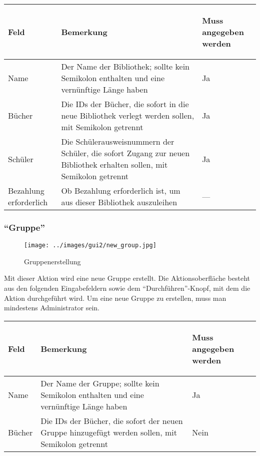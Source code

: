 \begin{tabular}{|p{}|p{}|p{}|}\hline
\begin{center}Feld\end{center} & \begin{center}Bemerkung\end{center} & \begin{center}Muss angegeben werden\end{center}\\
\hline
Name & Der Name der Bibliothek; sollte kein Semikolon enthalten und eine vernünftige Länge haben & Ja\\
\hline
Bücher & Die IDs der Bücher, die sofort in die neue Bibliothek verlegt werden sollen, mit Semikolon getrennt & Ja\\
\hline
Schüler & Die Schülerausweisnummern der Schüler, die sofort Zugang zur neuen Bibliothek erhalten sollen, mit Semikolon getrennt & Ja\\
\hline
Bezahlung erforderlich & Ob Bezahlung erforderlich ist, um aus dieser Bibliothek auszuleihen &  ---\\
\hline
\end{tabular}


\subsubsection{``Gruppe''}
\label{subsubsec:detail:new:group}
\begin{figure}\texttt{[image: ../images/gui2/new\_group.jpg]}\caption{Gruppenerstellung}\label{fig:new_group}\end{figure}

Mit dieser Aktion wird eine neue Gruppe erstellt. Die Aktionsoberfläche besteht aus den folgenden Eingabefeldern sowie dem ``Durchführen''-Knopf, mit dem die Aktion durchgeführt wird.
Um eine neue Gruppe zu erstellen, muss man mindestens Administrator sein.

\begin{tabular}{|p{}|p{}|p{}|}\hline
\begin{center}Feld\end{center} & \begin{center}Bemerkung\end{center} & \begin{center}Muss angegeben werden\end{center}\\
\hline
Name & Der Name der Gruppe; sollte kein Semikolon enthalten und eine vernünftige Länge haben & Ja\\
\hline
Bücher & Die IDs der Bücher, die sofort der neuen Gruppe hinzugefügt werden sollen, mit Semikolon getrennt & Nein\\
\hline
\end{tabular}

